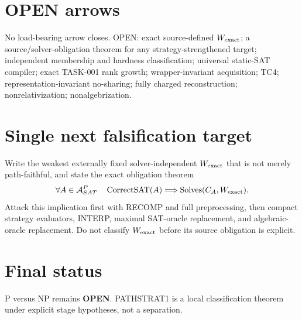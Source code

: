 \documentclass[11pt]{article}
\begin{document}
\section*{OPEN arrows}
No load-bearing arrow closes. OPEN: exact source-defined $W_{\rm exact}$; a source/solver-obligation theorem for any strategy-strengthened target; independent membership and hardness classification; universal static-SAT compiler; exact TASK-001 rank growth; wrapper-invariant acquisition; TC4; representation-invariant no-sharing; fully charged reconstruction; nonrelativization; nonalgebrization.

\section*{Single next falsification target}
Write the weakest externally fixed solver-independent $W_{\rm exact}$ that is not merely path-faithful, and state the exact obligation theorem
\[
\forall A\in{\cal A}^{P}_{SAT}\quad
\operatorname{CorrectSAT}(A)\Longrightarrow
\operatorname{Solves}(C_A,W_{\rm exact}).
\]
Attack this implication first with RECOMP and full preprocessing, then compact strategy evaluators, INTERP, maximal SAT-oracle replacement, and algebraic-oracle replacement. Do not classify $W_{\rm exact}$ before its source obligation is explicit.

\section*{Final status}
P versus NP remains \textbf{OPEN}. PATHSTRAT1 is a local classification theorem under explicit stage hypotheses, not a separation.

\end{document}
